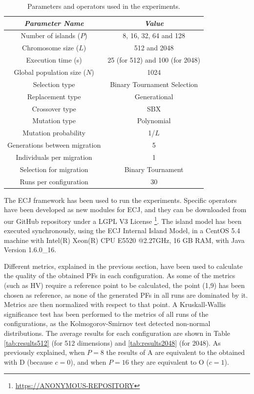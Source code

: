\documentclass[Crown,sagev,times,doublespace]{sagej}
\begin{document}
\begin{table}
\begin{center}
\begin{tabular}{|c|c|}
\hline
{\em Parameter Name} & {\em Value} \\ \hline
Number of islands ($P$) & 8, 16, 32, 64 and 128 \\ \hline
Chromosome size ($L$) & 512 and 2048 \\ \hline
Execution time (s) & 25 (for 512) and 100 (for 2048) \\ \hline \hline
Global population size ($N$) & 1024 \\ \hline
Selection type & Binary Tournament Selection \\ \hline
Replacement type & Generational \\ \hline 
Crossover type & SBX \\ \hline
Mutation  type & Polynomial\\ \hline
Mutation probability & 1/$L$ \\ \hline
Generations between migration & 5 \\ \hline
Individuals per migration & 1 \\ \hline
Selection for migration & Binary Tournament\\ \hline
Runs per configuration & 30 \\ \hline
\end{tabular}
\caption{Parameters and operators used in the experiments.}
\label{tab:parameters}
\end{center}
\end{table}

The ECJ framework \citep{ECJ} has been used to run the
experiments. Specific operators have been developed as new modules for
ECJ, and they can be downloaded from our GitHub repository under a
LGPL V3 License
\footnote{\url{https://ANONYMOUS-REPOSITORY}}. 
The
island model has been executed synchronously, using the ECJ Internal
Island Model, in a CentOS 5.4 machine with Intel(R) Xeon(R) CPU E5520
@2.27GHz, 16 GB RAM, with Java Version 1.6.0\_16.


Different metrics, explained in the previous section, have been used to calculate the quality of the obtained PFs in each configuration. As some of the metrics  (such as HV) require a reference point to be calculated, the point (1,9) has been chosen as reference, as none of the generated PFs in all runs are dominated by it. Metrics are then normalized with respect to that point. A Kruskall-Wallis significance test has been performed to the metrics of all runs of the configurations, as the Kolmogorov-Smirnov test detected non-normal distributions. The average results for each configuration are shown in Table \ref{tab:results512} (for 512 dimensions) and \ref{tab:results2048} (for 2048). As previously explained, when $P=8$ the results of A are equivalent to the obtained with D (because $c=0$), and when $P=16$ they are equivalent to O ($c=1$).
\end{document}
